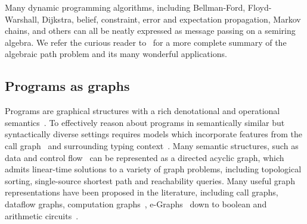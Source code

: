 \documentclass[sigplan,10pt,review,anonymous]{acmart}
\begin{document}
\noindent Many dynamic programming algorithms, including Bellman-Ford, Floyd-Warshall, Dijkstra, belief, constraint, error and expectation propagation, Markov chains, and others can all be neatly expressed as message passing on a semiring algebra. We refer the curious reader to~\cite{gondran2008graphs,baras2010path} for a more complete summary of the algebraic path problem and its many wonderful applications.

%
%

\subsection{Programs as graphs}\label{sec:program-graphs}

Programs are graphical structures with a rich denotational and operational semantics~\cite{henkel2018code}. To effectively reason about programs in semantically similar but syntactically diverse settings requires models which incorporate features from the call graph~\cite{liu2019neural} and surrounding typing context~\cite{allamanis2017learning}. Many semantic structures, such as data and control flow~\cite{si2018learning} can be represented as a directed acyclic graph, which admits linear-time solutions to a variety of graph problems, including topological sorting, single-source shortest path and reachability queries. Many useful graph representations have been proposed in the literature, including call graphs, dataflow graphs, computation graphs~\citep{breuleux2017automatic}, e-Graphs~\citep{willsey2020egg} down to boolean and arithmetic circuits~\citep{miller1988efficient}.
\end{document}
